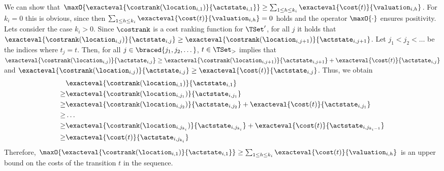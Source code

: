 We can show that $\maxO{\exacteval{\costrank(\location_{i,1})}{\actstate_{i,1}}} \geq \sum_{1 \leq h \leq {k_i}} \exacteval{\cost(t)}{\valuation_{i,h}}$.
For $k_i = 0$ this is obvious, since then $\sum_{1 \leq h \leq {k_i}} \exacteval{\cost(t)}{\valuation_{i,h}} = 0$ holds and the operator $\maxO{\cdot}$ ensures positivity.
Lets consider the case $k_i > 0$.
Since $\costrank$ is a cost ranking function for $\TSet'$, for all $j$ it holds that $\exacteval{\costrank(\location_{i,j})}{\actstate_{i,j}} \geq \exacteval{\costrank(\location_{i,j+1})}{\actstate_{i,j+1}}$.
Let $j_1 < j_2 < \dots$ be the indices where $t_j = t$.
Then, for all $j \in \braced{j_1, j_2, \dots}$, $t \in \TSet_>$ implies that $\exacteval{\costrank(\location_{i,j})}{\actstate_{i,j}} \geq \exacteval{\costrank(\location_{i,j+1})}{\actstate_{i,j+1}} + \exacteval{\cost(t)}{\actstate_{i,j}}$ and $\exacteval{\costrank(\location_{i,j})}{\actstate_{i,j}} \geq \exacteval{\cost(t)}{\actstate_{i,j}}$.
Thus, we obtain
\begin{align*}
  & \exacteval{\costrank(\location_{i,1})}{\actstate_{i,1}} \\
  \geq & \exacteval{\costrank(\location_{i,j_1})}{\actstate_{i,j_1}} \\
  \geq & \exacteval{\costrank(\location_{i,j_2})}{\actstate_{i,j_2}} + \exacteval{\cost(t)}{\actstate_{i,j_1}} \\
  \geq & \dots \\
  \geq & \exacteval{\costrank(\location_{i,j_{k_i}})}{\actstate_{i,j_{k_i}}} + \exacteval{\cost(t)}{\actstate_{i,j_{k_i-1}}} \\
  \geq & \exacteval{\cost(t)}{\actstate_{i,j_{k_i}}}
\end{align*}
Therefore, $\maxO{\exacteval{\costrank(\location_{i,1})}{\actstate_{i,1}}} \geq \sum_{1 \leq h \leq {k_i}} \exacteval{\cost(t)}{\valuation_{i,h}}$ is an upper bound on the costs of the transition $t$ in the sequence.

